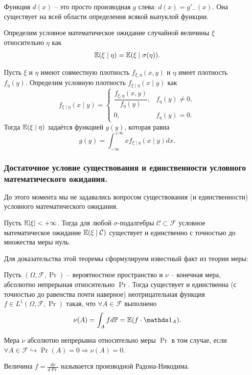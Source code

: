 \begin{note}
    Функция $d(x)$ -- это просто производная $g$ слева: $d(x) = g'_{-}(x)$. Она существует на всей области определения всякой выпуклой функции.
\end{note}
\begin{definition}
    Определим условное математическое ожидание случайной величины $\xi$ относительно $\eta$ как 
    \[
        \mathbb{E}(\xi \mid \eta) = \mathbb{E}(\xi \mid \sigma(\eta)).
    \]
\end{definition}
\begin{example}
    Пусть $\xi$ и $\eta$ имеют совместную плотность $f_{\xi,\eta}(x, y)$ и $\eta$ имеет плотность $f_{\eta}(y)$. Определим условную плотность $f_{\xi \mid \eta}(x \mid y)$ как
    \[f_{\xi\mid\eta}(x\mid y) = \begin{cases}
        \dfrac{f_{\xi, \eta}(x, y)}{f_{\eta}(y)}, & f_{\eta}(y) \neq 0, \\
        0, & f_{\eta}(y) = 0.
    \end{cases}\]
    Тогда $\mathbb{E}(\xi \mid \eta)$ задаётся функцией $g(y)$, которая равна 
    \[
        g(y) = \int_{-\infty}^{+\infty} x f_{\xi\mid \eta}(x \mid y)dx.
    \]
\end{example}
\subsubsection{Достаточное условие существования и единственности условного математического ожидания.}
До этого момента мы не задавались вопросом существования (и единственности) условного математического ожидания. 
\begin{theorem}
    Пусть $\mathbb{E}|\xi| < +\infty$. Тогда для любой $\sigma$-подалгебры $\mathcal{C} \subset\mathcal{F}$ условное математическое ожидание $\mathbb{E}(\xi \mid \mathcal{C})$ существует и единственно с точностью до множества меры нуль.
\end{theorem}
Для доказательства этой теоремы сформулируем известный факт из теории меры:
\begin{theorem}
    Пусть $(\Omega, \mathcal{F}, \Pr)$ -- вероятностное пространство и $\nu$ -- конечная мера, абсолютно непрерыная относительно $\Pr$. Тогда существует и единственна (с точностью до равенства почти наверное) неотрицательная функция $f \in L^1(\Omega, \mathcal{F}, \Pr)$ такая, что $\forall A \in \mathcal{F}$ выполнено
    \[
        \nu(A) = \int_{A} f d\Pr = \Ex(f \cdot \Ind_{A}).
    \]
\end{theorem}
\begin{reminder}
    Мера $\nu$ абсолютно непрерывна относительно меры $\Pr$ в том случае, если $\forall A \in \mathcal{F} \hookrightarrow \Pr(A) = 0 \Rightarrow \nu(A) = 0$.
\end{reminder}
\begin{note}
    Величина $f = \frac{d\nu}{d\Pr}$ называется производной Радона-Никодима.
\end{note}

